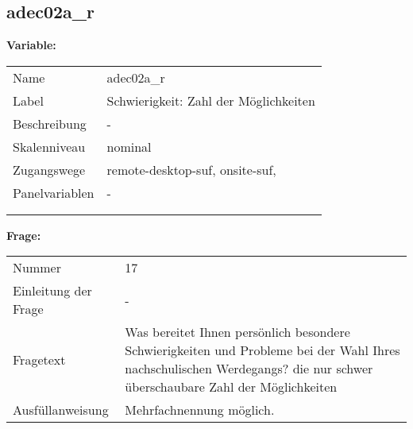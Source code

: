 	
	
	\subsection{adec02a\_r}
	\label{subSection:adec02a_r}

	\noindent\textbf{Variable:}\\
		\begin{tabular}{lL{11.3cm}}
			\label{tableVariable:adec02a_r}
			Name & adec02a\_r \\
			Label & Schwierigkeit: Zahl der Möglichkeiten \\
			Beschreibung & - \\
			Skalenniveau & nominal \\
			Zugangswege &
				remote-desktop-suf,
				onsite-suf,
 \\
			Panelvariablen & -
			 \\
			 \\
 \\
		\end{tabular}

		\vspace*{1 cm}
		\noindent\textbf{Frage:}\\
		\begin{tabular}{lL{11.3cm}}
			\label{tableQuestion:adec02a_r}
			Nummer & 17 \\
			Einleitung der Frage & - \\
			Fragetext & Was bereitet Ihnen persönlich besondere Schwierigkeiten und Probleme bei der Wahl Ihres nachschulischen Werdegangs?
die nur schwer überschaubare Zahl der Möglichkeiten \\
			Ausfüllanweisung & Mehrfachnennung möglich. \\
		\end{tabular}





